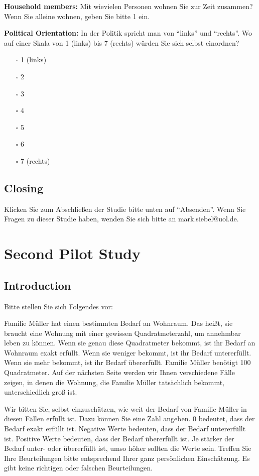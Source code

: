 \documentclass[egregdoesnotlikesansseriftitles]{scrartcl}
\begin{document}
\vspace{1em}
\noindent\textbf{Household members:} Mit wievielen Personen wohnen Sie zur Zeit zusammen? Wenn Sie alleine wohnen, geben Sie bitte 1 ein.

\vspace{1em}
\noindent\textbf{Political Orientation:} In der Politik spricht man von \enquote{links} und \enquote{rechts}. Wo auf einer Skala von 1 (links) bis 7 (rechts) würden Sie sich selbst einordnen?
\begin{itemize}
   \item[$\square$] 1 (links)
   \item[$\square$] 2
   \item[$\square$] 3
   \item[$\square$] 4
   \item[$\square$] 5
   \item[$\square$] 6
   \item[$\square$] 7 (rechts)
\end{itemize}


\subsection*{Closing}
Klicken Sie zum Abschließen der Studie bitte unten auf \enquote{Absenden}. Wenn Sie Fragen zu dieser Studie haben, wenden Sie sich bitte an mark.siebel@uol.de.


\clearpage
\section{Second Pilot Study}\label{sec:app_pilot_2}
\subsection*{Introduction}
Bitte stellen Sie sich Folgendes vor:

Familie Müller hat einen bestimmten Bedarf an Wohnraum.
Das heißt, sie braucht eine Wohnung mit einer gewissen Quadratmeterzahl, um annehmbar leben zu können.
Wenn sie genau diese Quadratmeter bekommt, ist ihr Bedarf an Wohnraum exakt erfüllt.
Wenn sie weniger bekommt, ist ihr Bedarf untererfüllt.
Wenn sie mehr bekommt, ist ihr Bedarf übererfüllt.
Familie Müller benötigt 100 Quadratmeter.
Auf der nächsten Seite werden wir Ihnen verschiedene Fälle zeigen, in denen die Wohnung, die Familie Müller tatsächlich bekommt, unterschiedlich groß ist.

Wir bitten Sie, selbst einzuschätzen, wie weit der Bedarf von Familie Müller in diesen Fällen erfüllt ist.
Dazu können Sie eine Zahl angeben.
0 bedeutet, dass der Bedarf exakt erfüllt ist.
Negative Werte bedeuten, dass der Bedarf untererfüllt ist.
Positive Werte bedeuten, dass der Bedarf übererfüllt ist.
Je stärker der Bedarf unter- oder übererfüllt ist, umso höher sollten die Werte sein.
Treffen Sie Ihre Beurteilungen bitte entsprechend Ihrer ganz persönlichen Einschätzung.
Es gibt keine richtigen oder falschen Beurteilungen.
\end{document}
